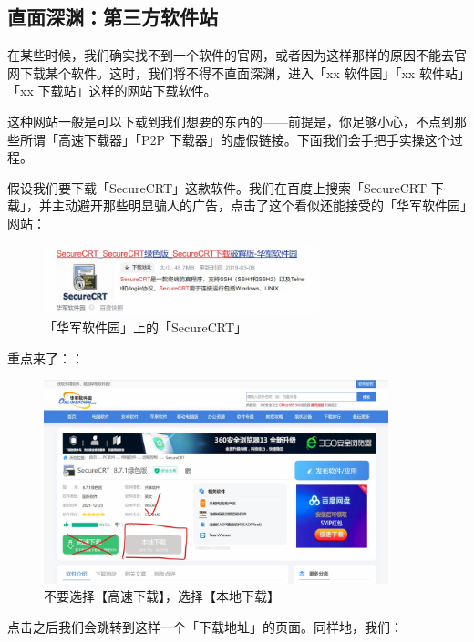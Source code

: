 \subsection{直面深渊：第三方软件站}

在某些时候，我们确实找不到一个软件的官网，或者因为这样那样的原因不能去官网下载某个软件。这时，我们将不得不直面深渊，进入「xx 软件园」「xx 软件站」「xx 下载站」这样的网站下载软件。

这种网站一般是可以下载到我们想要的东西的——前提是，你足够小心，不点到那些所谓「高速下载器」「P2P 下载器」的虚假链接。下面我们会手把手实操这个过程。

假设我们要下载「SecureCRT」这款软件。我们在百度上搜索「SecureCRT 下载」，并主动避开那些明显骗人的广告，点击了这个看似还能接受的「华军软件园」网站：

\begin{figure}[H]
  \centering
  \includegraphics[width=8cm]{assets/Huajun_1.jpg}
  \caption{「华军软件园」上的「SecureCRT」}
  \label{huajun-1}
\end{figure}

重点来了：：

\begin{figure}[H]
  \centering
  \includegraphics[width=10cm]{assets/Huajun_2.jpg}
  \caption{不要选择【高速下载】，选择【本地下载】}
  \label{huajun-2}
\end{figure}

点击之后我们会跳转到这样一个「下载地址」的页面。同样地，我们：

